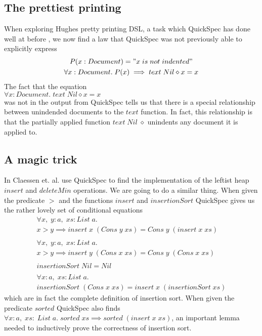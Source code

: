 \subsection{The prettiest printing}
    When exploring Hughes pretty printing DSL,\cite{Hughes1995}
    a task which QuickSpec has done well at before%
    , we now find a law that QuickSpec
    was not previously able to explicitly express
    \begin{gather*}
        P(x:Document) = "x\; is\; not\; indented"\\
        \forall x:Document.\; P(x)\implies text\;Nil\diamond x=x
    \end{gather*}
    The fact that the equation\\
    $\forall x:Document.\; text\;Nil\diamond x = x$\\
    was not in the output from QuickSpec tells us that there is a special
    relationship between unindended documents to the $text$ function. In fact, this relationship
    is that the partially applied function $text\;Nil\;\diamond$ unindents any document it is applied to. 

\subsection{A magic trick}
    In \cite{Claessen2010}Claessen et. al.
    use QuickSpec to find the implementation of the leftist
    heap $insert$ and $deleteMin$ operations. 
    We are going to do a similar thing. When given the predicate
    $>$ and the functions $insert$ and $insertionSort$ QuickSpec gives us
    the rather lovely set of conditional equations
    \begin{gather*}
        \forall x,\;y:a,\; xs:List\; a.\\
        x > y \implies insert\; x\; (Cons\; y\; xs) = Cons\; y\; (insert\; x\; xs)\\\\
        \forall x,\;y:a,\; xs:List\; a.\\
        x > y \implies insert\; y\; (Cons\; x\; xs) = Cons\; y\; (Cons\; x\; xs)\\\\
        insertionSort\; Nil = Nil\\\\
        \forall x:a,\; xs:List\; a.\\
        insertionSort\; (Cons\; x\; xs) = insert\; x\; (insertionSort\; xs)
    \end{gather*}
    which are in fact the complete definition of insertion sort.
    When given the predicate $sorted$ QuickSpec also finds
    $\forall x:a,\; xs:\;List\;a.\; sorted\; xs \implies sorted\; (insert\; x\; xs)$,
    an important lemma needed to inductively prove the correctness of insertion sort.
